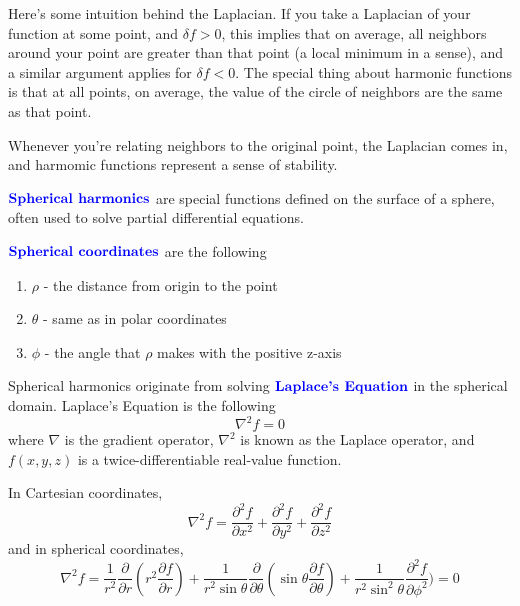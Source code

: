 \documentclass[12pt]{scrartcl}
\begin{document}
\begin{note}
    Here's some intuition behind the Laplacian. If you take a Laplacian of your function at some point, and $\delta f > 0$, this implies that on average, all neighbors around your point are greater than that point (a local minimum in a sense), and a similar argument applies for $\delta f < 0$. The special thing about harmonic functions is that at all points, on average, the value of the circle of neighbors are the same as that point. 

    Whenever you're relating neighbors to the original point, the Laplacian comes in, and harmomic functions represent a sense of stability.
\end{note}

\begin{definition}
    $\textbf{\color{blue} Spherical harmonics}$ are special functions defined on the surface of a sphere, often used to solve partial differential equations.
\end{definition}

\begin{definition}
    $\textbf{\color{blue} Spherical coordinates}$ are the following
\begin{enumerate}
    \item $\rho$ - the distance from origin to the point
    \item $\theta$ - same as in polar coordinates
    \item $\phi$ - the angle that $\rho$ makes with the positive z-axis
\end{enumerate}
\end{definition}

\begin{lemma}
    Spherical harmonics originate from solving $\textbf{\color{blue} Laplace's Equation}$ in the spherical domain. Laplace's Equation is the following
\[\nabla^2 f = 0\] where $\nabla$ is the gradient operator, $\nabla^2$ is known as the Laplace operator, and $f(x,y,z)$ is a twice-differentiable real-value function.

In Cartesian coordinates,
\[\nabla^2f = \frac{\partial^2 f}{\partial x^2} + \frac{\partial^2 f }{\partial y^2} + \frac{\partial^2 f}{\partial z^2}\]
and in spherical coordinates,
\[\nabla^2f = \frac{1}{r^2}\frac{\partial}{\partial r}(r^2 \frac{\partial f}{\partial r}) + \frac{1}{r^2\sin\theta}\frac{\partial}{\partial \theta}(\sin \theta \frac{\partial f}{\partial \theta}) + \frac{1}{r^2\sin^2\theta}\frac{\partial^2 f}{\partial \phi^2}) = 0\]
\end{lemma}
\end{document}

